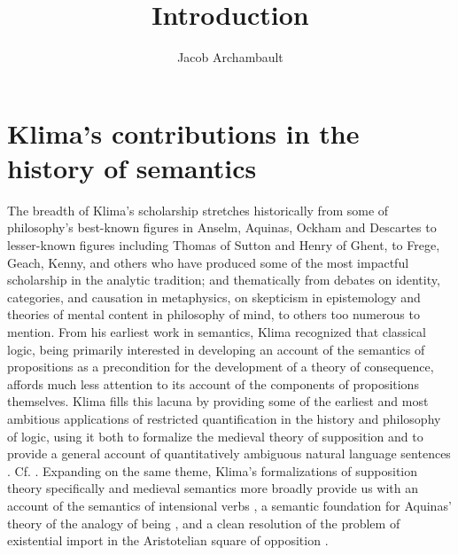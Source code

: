 \documentclass[]{article}
\title{Introduction}
\author{Jacob Archambault}
\begin{document}
\maketitle

\section{Klima's contributions in the history of semantics}
The breadth of Klima's scholarship stretches 
historically from some of philosophy's best-known figures in Anselm, Aquinas, Ockham and Descartes 
to lesser-known figures including Thomas of Sutton and Henry of Ghent, 
to Frege, Geach, Kenny, and others who have produced some of the most impactful scholarship in the analytic tradition; 
and 
thematically from debates 
on identity, categories, and causation in metaphysics, 
on skepticism in epistemology and theories of mental content in philosophy of mind, 
to others too numerous to mention. 
From his earliest work in semantics, 
Klima recognized that classical logic, 
being primarily interested in developing an account of the semantics of propositions as a precondition for the development of a theory of consequence, 
affords much less attention to its account of the components of propositions themselves.
Klima fills this lacuna by providing some of the earliest and most ambitious applications of restricted quantification in the history and philosophy of logic, 
using it both to formalize the medieval theory of supposition 
and to provide a general account of quantitatively ambiguous natural language sentences \autocite{Klima1988,Klima1990,KlimaSandu1990,Klima1991b}. Cf. \autocite{Parsons2014}. 
Expanding on the same theme, 
Klima's formalizations of supposition theory specifically 
and medieval semantics more broadly 
provide us with an account of the semantics of intensional verbs \autocite{Klima1991}, 
a semantic foundation for Aquinas' theory of the analogy of being \autocite{Klima1996,Klima2002}, 
and a clean resolution of the problem of existential import in the Aristotelian square of opposition \autocite{Klima2001}. 
\end{document}

